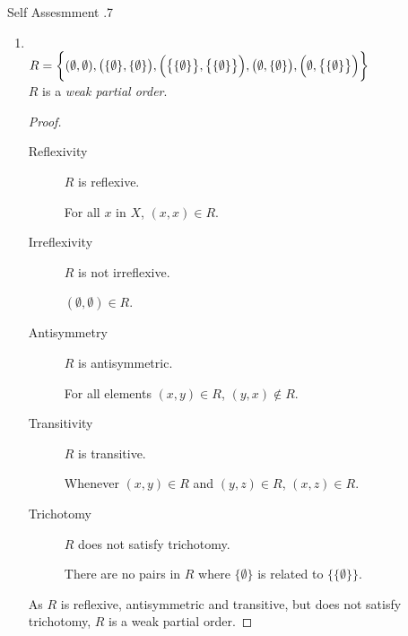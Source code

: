 \documentclass[../notes.tex]{subfiles}
\begin{document}
\begin{exercise}{Self Assesmment \thechapter.7}
\begin{enumerate}
\begin{enumerate}[label=(\alph*)]
								\tcbbreak
								\item {}\\
									$R = \biggl\{(\emptyset, \emptyset), \bigl(\{\emptyset\}, \{\emptyset\}\bigr), \Bigl(\bigl\{\{\emptyset \}\bigr\}, \bigl\{\{\emptyset\}\bigr\}\Bigr), \bigl(\emptyset, \{\emptyset\}\bigr), \Bigl(\emptyset, \bigl\{\{\emptyset\}\bigr\}\Bigr)\biggr\}$\\
									$R$ is a \emph{weak partial order}.
									\begin{proof}
										$ $
										\begin{description}
											\item[Reflexivity] $R$ is reflexive.
												\begin{subproof}
													For all $x$ in $X$, $(x, x) \in R$.
												\end{subproof}
											\item[Irreflexivity] $R$ is not irreflexive.
												\begin{subproof}[Counterexample]
													$(\emptyset, \emptyset) \in R$.
												\end{subproof}
											\item[Antisymmetry] $R$ is antisymmetric.
												\begin{subproof}
													For all elements $(x, y) \in R$, $(y, x) \notin R$.
												\end{subproof}
											\item[Transitivity] $R$ is transitive.
												\begin{subproof}
													Whenever $(x, y) \in R$ and $(y, z) \in R$, $(x, z) \in R$.
												\end{subproof}
											\item[Trichotomy] $R$ does not satisfy trichotomy.
												\begin{subproof}[Counterexample]
													There are no pairs in $R$ where $\{\emptyset\}$ is related to $\bigl\{\{\emptyset\}\bigr\}$.
												\end{subproof}
										\end{description}
										As $R$ is reflexive, antisymmetric and transitive, but does not satisfy trichotomy, $R$ is a weak partial order.
									\end{proof}
							\end{enumerate}

\end{enumerate}
\end{exercise}
\end{document}
